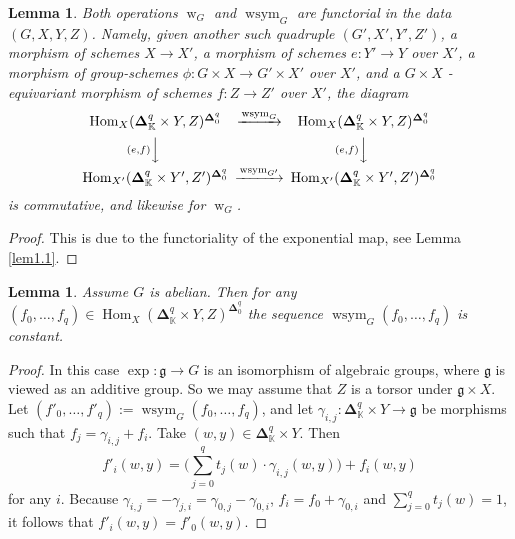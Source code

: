 \documentclass[10pt]{amsart}
\newtheorem{lem}[equation]{Lemma}
\theoremstyle{definition}
\numberwithin{equation}{section}
\newcommand{\opn}{\operatorname}
\newcommand{\mfrak}[1]{\mathfrak{#1}}
\newcommand{\mbb}[1]{\mathbb{#1}}
\newcommand{\bsym}[1]{\boldsymbol{#1}}
\newcommand{\K}{\mbb{K}}
\begin{document}
\begin{lem} \label{lem6.X2}
Both operations $\opn{w}_G$ and $\opn{wsym}_G$ are functorial in 
the data \linebreak $(G, X, Y, Z)$. Namely, given another such 
quadruple $(G', X', Y', Z')$, a morphism 
of schemes $X \to X'$, a morphism of schemes
$e : Y' \to Y$ over $X'$, a morphism of group-schemes 
$\phi : G \times X \to G' \times X'$ over $X'$, and a 
$G \times X$ -equivariant morphism of 
schemes $f : Z \to Z'$ over $X'$, the diagram
\[ \begin{CD}
\opn{Hom}_X(\bsym{\Delta}^q_{\K} \times Y, Z)
^{\bsym{\Delta}^q_{0}}
@>{\opn{wsym}_G}>>
\opn{Hom}_X(\bsym{\Delta}^q_{\K} \times Y, Z)
^{\bsym{\Delta}^q_{0}} \\
@V{(e, f)}VV @V{(e, f)}VV \\
\opn{Hom}_{X'}(\bsym{\Delta}^q_{\K} \times Y', Z')
^{\bsym{\Delta}^q_{0}}
@>{\opn{wsym}_{G'}}>>
\opn{Hom}_{X'}(\bsym{\Delta}^q_{\K} \times Y', Z')
^{\bsym{\Delta}^q_{0}} 
\end{CD} \]
is commutative, and likewise for $\opn{w}_G$.
\end{lem}

\begin{proof}
This is due to the functoriality of the exponential map, see Lemma 
\ref{lem1.1}.
\end{proof}

\begin{lem} \label{lem6.X3}
Assume $G$ is abelian. Then for any
$(f_0, \ldots, f_q) \in \opn{Hom}_X(\bsym{\Delta}^q_{\K} \times Y, Z)
^{\bsym{\Delta}^q_{0}}$
the sequence
$\opn{wsym}_{G}(f_0, \ldots, f_q)$ is constant. 
\end{lem}

\begin{proof}
In this case $\opn{exp} : \mfrak{g} \to G$ is an isomorphism of 
algebraic groups, where $\mfrak{g}$ is viewed as an additive 
group. So we may assume that $Z$ is a torsor under 
$\mfrak{g} \times X$. Let
$(f'_0, \ldots, f'_q) := \opn{wsym}_{G}(f_0, \ldots, f_q)$,
and let 
$\gamma_{i,j} : \bsym{\Delta}^q_{\K} \times Y \to \mfrak{g}$
be morphisms such that 
$f_j  = \gamma_{i, j} + f_i$. 
Take $(w, y) \in \bsym{\Delta}^q_{\K} \times Y$. Then 
\[ f'_i(w,y) = 
\Big( \sum_{j=0}^q t_j(w) \cdot \gamma_{i,j}(w,y) \Big)
+ f_i(w,y) \]
for any $i$. Because
$\gamma_{i,j} = - \gamma_{j,i} = \gamma_{0,j} - \gamma_{0,i}$,
$f_i = f_0 + \gamma_{0,i}$ and 
$\sum_{j=0}^q t_j(w) = 1$, 
it follows that
$f'_i(w,y) = f'_0(w,y)$.
\end{proof}
\end{document}
